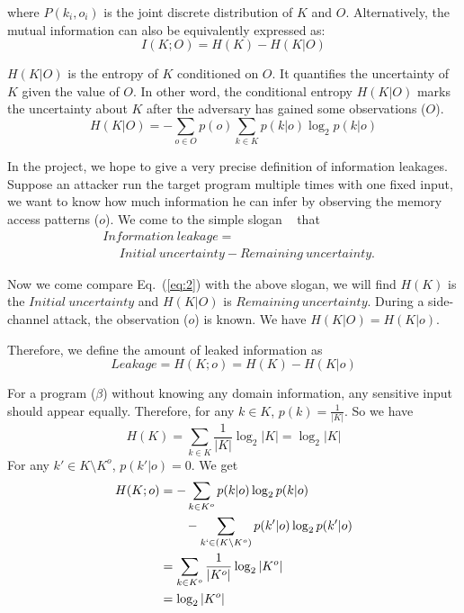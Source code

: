 where $P(k_i, o_i)$ is the joint discrete distribution of $K$ and $O$.
Alternatively, the mutual information can also be equivalently expressed as:
\begin{equation} \label{eq:2}
    I(K;O) = H(K) - H(K|O)
\end{equation}

$H(K|O)$ is the entropy of $K$ conditioned on $O$. It quantifies the uncertainty
of $K$ given the value of $O$. In other word, the conditional entropy $H(K|O)$
marks the uncertainty about $K$ after the adversary has gained some observations
($O$).
\begin{equation}
    H(K|O) = - \sum_{o {\in} O} {p(o) \sum_{k {\in} K}{p(k|o)\log_2p(k|o)}}
\end{equation}

In the project, we hope to give a very precise definition of information
leakages. Suppose an attacker run the target program multiple times with one
fixed input, we want to know how much information he can infer by observing the
memory access patterns ($o$). We come to the simple slogan
~\cite{10.1007/978-3-642-00596-1_21} %
that
\begin{align*}
     & \mathit{Information\ leakage} =                                         \\
     & ~~~~~~ \mathit{Initial\ uncertainty} - \mathit{Remaining\ uncertainty}.
\end{align*}

Now we come compare Eq.~(\ref{eq:2}) with the above slogan, we will find $H(K)$
is the $\mathit{Initial\ uncertainty}$ and $H(K|O)$ is $\mathit{Remaining\
uncertainty}$. During a side-channel attack, the observation ($o$) is known.  We
have $H(K|O) = H(K|o)$.

Therefore, we define the amount of leaked information as
\begin{displaymath}
    Leakage = H(K;o) = H(K) - H(K|o)
\end{displaymath}

For a program ($\beta$) without knowing any domain information, any sensitive
input should appear equally. Therefore, for any $k \in K$, $p(k) =
\frac{1}{|K|}$. So we have
$$H(K) = \sum_{k {\in} K}\frac{1}{|K|}\log_2{|K|} = \log_2{|K|}$$
For any $k' \in K \setminus K^o$, $p(k'|o) = 0$. We get
\begin{align*}
    H(K;o) & = - \sum_{k {\in} K^o}{p(k|o)\log_2p(k|o)}                         \\
           & \qquad   - \sum_{k` {\in} (K \setminus K^o)}{p(k'|o)\log_2p(k'|o)} \\
           & = \sum_{k {\in} K^o}\frac{1}{|K^o|}\log_2{|K^o|}                   \\
           & = \log_2{|K^o|}
\end{align*}


